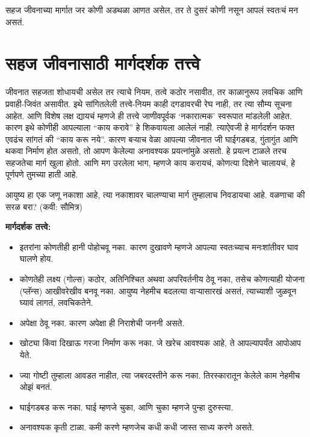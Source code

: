 सहज जीवनाच्या मार्गात जर कोणी अडथळा आणत असेल, तर ते दुसरं कोणी नसून आपलं स्वतःचं मन असतं.


\chapter{सहज जीवनासाठी मार्गदर्शक तत्त्वे}

जीवनात सहजता शोधायची असेल तर त्याचे नियम, तत्वे  कठोर नसावीत, तर काळानुरूप लवचिक आणि प्रवाही-जिवंत असावीत. इथे सांगितलेली तत्त्वे-नियम काही दगडावरची रेघ नाही, तर त्या सौम्य सूचना आहेत. आणि विशेष लक्ष द्यायचं म्हणजे ही तत्त्वे जाणीवपूर्वक ‘नकारात्मक’ स्वरूपात मांडलेली आहेत. कारण इथे कोणीही आपल्याला “काय करावे” हे शिकवायला आलेलं नाही. त्याऐवजी हे मार्गदर्शन फक्त एवढंच सांगतं की “काय करू नये”. कारण बऱ्याच वेळा आपल्या जीवनात जी घाईगडबड, गुंतागुंत आणि थकवा निर्माण होत असतो, तो आपण केलेल्या अनावश्यक प्रयत्नांमुळे असतो. हे प्रयत्न टाळले तरच सहजतेचा मार्ग खुला होतो. आणि मग उरलेला भाग, म्हणजे काय करायचं, कोणत्या दिशेने चालायचं, हे पूर्णपणे तुमच्या हाती आहे.

आयुष्य हा एक जणू नकाशा आहे, त्या नकाशावर चालण्याचा मार्ग तुम्हालाच निवडायचा आहे. वळणाचा की सरळ बरा? (कवी: सौमित्र)

\textbf{मार्गदर्शक तत्त्वे:}
\begin{itemize}
\item इतरांना कोणतीही हानी पोहोचवू नका. कारण दुखावणे म्हणजे आपल्या स्वतःच्याच मनःशांतीवर घाव घालणे होय.
\item कोणतेही लक्ष्य (गोल्स) कठोर, अतिनिश्चित अथवा अपरिवर्तनीय ठेवू नका, तसेच कोणत्याही योजना (प्लॅन्स)  आखीवरेखीव बनवू  नका. आयुष्य नेहमीच बदलत्या वाऱ्यासारखं असतं, त्याच्याशी जुळवून घ्यावं लागतं, लवचिकतेने.
\item अपेक्षा ठेवू नका. कारण अपेक्षा ही निराशेची जननी असते.
\item खोट्या किंवा दिखाऊ गरजा निर्माण करू नका. जे खरेच आवश्यक आहे, ते आपल्यापर्यंत आपोआप येते.
\item ज्या गोष्टी तुम्हाला आवडत नाहीत, त्या जबरदस्तीने करू नका. तिरस्कारातून केलेले काम नेहमीच ओझं बनतं.
\item घाईगडबड करू नका. घाई म्हणजे चुका, आणि चुका म्हणजे पुन्हा दुरुस्त्या.
\item अनावश्यक कृती टाळा. कमी करणे म्हणजेच कधी कधी जास्त साध्य करणे असते.
\end{itemize}


